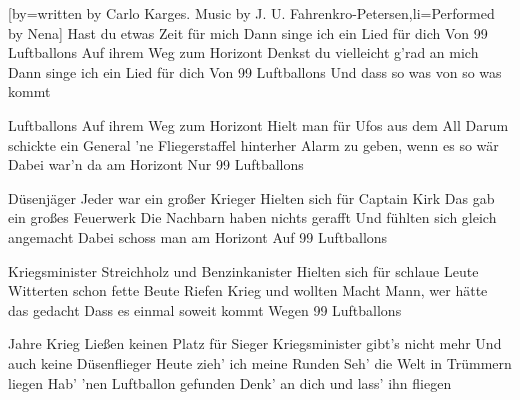 [by={written by Carlo Karges. Music by J. U. Fahrenkro-Petersen},li={Performed by Nena}]
\beginverse
Hast du etwas Zeit für mich
Dann singe ich ein Lied für dich
Von 99 Luftballons
Auf ihrem Weg zum Horizont
Denkst du vielleicht g'rad an mich
Dann singe ich ein Lied für dich
Von 99 Luftballons
Und dass so was von so was kommt
\endverse

 Luftballons
Auf ihrem Weg zum Horizont
Hielt man für Ufos aus dem All
Darum schickte ein General
'ne Fliegerstaffel hinterher
Alarm zu geben, wenn es so wär
Dabei war'n da am Horizont
Nur 99 Luftballons
\endverse

 Düsenjäger
Jeder war ein großer Krieger
Hielten sich für Captain Kirk
Das gab ein großes Feuerwerk
Die Nachbarn haben nichts gerafft
Und fühlten sich gleich angemacht
Dabei schoss man am Horizont
Auf 99 Luftballons
\endverse

 Kriegsminister
Streichholz und Benzinkanister
Hielten sich für schlaue Leute
Witterten schon fette Beute
Riefen Krieg und wollten Macht
Mann, wer hätte das gedacht
Dass es einmal soweit kommt
Wegen 99 Luftballons
\endverse

 Jahre Krieg
Ließen keinen Platz für Sieger
Kriegsminister gibt's nicht mehr
Und auch keine Düsenflieger
Heute zieh' ich meine Runden
Seh' die Welt in Trümmern liegen
Hab' 'nen Luftballon gefunden
Denk' an dich und lass' ihn fliegen
\endverse
\endsong